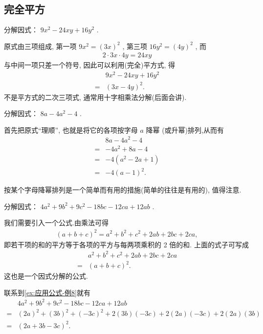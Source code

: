 \subsection{完全平方}
\begin{example}
	分解因式： $9 x^{2}-24 x y+16 y^{2}$ .
\end{example}
\begin{solution}
	原式由三项组成, 第一项 $9 x^{2}=(3 x)^{2}$ , 第三项 $16 y^{2}=(4 y)^{2}$ , 而
	\begin{align*}
		2 \cdot 3 x \cdot 4 y=24 x y
	\end{align*}
	与中间一项只差一个符号, 因此可以利用(完全)平方式, 得
	\begin{align*}
		  & 9 x^{2}-24 x y+16 y^{2} \\
		= & (3 x-4 y)^{2} .
	\end{align*}
	不是平方式的二次三项式, 通常用十字相乘法分解(后面会讲).
\end{solution}

\begin{example}
	分解因式： $8 a-4 a^{2}-4$ .
\end{example}
\begin{solution}
	首先把原式“理顺”, 也就是将它的各项按字母 $a$ 降幂 (或升幂)排列,从而有
	\begin{align*}
		  & 8 a-4 a^{2}-4              \\
		= & -4 a^{2}+8 a-4             \\
		= & -4\left(a^{2}-2 a+1\right) \\
		= & -4(a-1)^{2} .
	\end{align*}
\end{solution}
\begin{note}
	按某个字母降幂排列是一个简单而有用的措施(简单的往往是有用的), 值得注意.
\end{note}

\begin{example}\label{ex:应用公式-例8}
	分解因式： $4 a^{2}+9 b^{2}+9 c^{2}-18 b c-12 c a+12 a b$ .
\end{example}
\begin{solution}
	我们需要引入一个公式.由乘法可得
	\begin{align*}
		(a+b+c)^{2}=a^{2}+b^{2}+c^{2}+2 a b+2 b c+2 c a,
	\end{align*}
	即若干项的和的平方等于各项的平方与每两项乘积的 2 倍的和.
	上面的式子可写成
	\begin{align*}
		  & a^{2}+b^{2}+c^{2}+2 a b+2 b c+2 c a \\
		= & (a+b+c)^{2} .
	\end{align*}
	这也是一个因式分解的公式.

	联系到\autoref{ex:应用公式-例8}就有
	\begin{align*}
		  & 4 a^{2}+9 b^{2}+9 c^{2}-18 b c-12 c a+12 a b                         \\
		= & (2 a)^{2}+(3 b)^{2}+(-3 c)^{2}+2(3 b)(-3 c)+2(2 a)(-3 c)+2(2 a)(3 b) \\
		= & (2 a+3 b-3 c)^{2} .
	\end{align*}
\end{solution}

